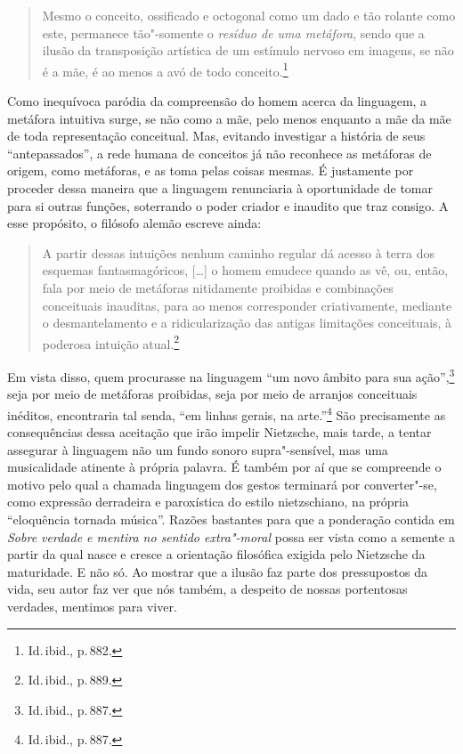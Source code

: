 \begin{quote}
Mesmo o
conceito, ossificado e octogonal como um dado e tão rolante como este,
permanece tão"-somente o \textit{resíduo de uma metáfora}, sendo que a
ilusão da transposição artística de um estímulo nervoso em imagens, se
não é a mãe, é ao menos a avó de todo conceito.\footnote{ Id.\,ibid.,
p.\,882. }
\end{quote}

Como inequívoca paródia da compreensão do homem acerca da linguagem, a
metáfora intuitiva surge, se não como a mãe, pelo menos enquanto a mãe
da mãe de toda representação conceitual. Mas, evitando investigar a
história de seus “antepassados”, a rede humana de conceitos já não
reconhece as metáforas de origem, como metáforas, e as toma pelas
coisas mesmas. É justamente por proceder dessa maneira que a linguagem
renunciaria à oportunidade de tomar para si outras funções, soterrando
o poder criador e inaudito que traz consigo. A esse propósito, o
filósofo alemão escreve ainda: 

\begin{quote}
A partir dessas intuições nenhum
caminho regular dá acesso à terra dos esquemas fantasmagóricos, [\ldots{}]
o homem emudece quando as vê, ou, então, fala por meio 
de metáforas nitidamente proibidas e combinações conceituais inauditas,
para ao menos corresponder criativamente, mediante o desmantelamento e
a ridicularização das antigas limitações conceituais, à poderosa
intuição atual.\footnote{ Id.\,ibid., p.\,889.}
\end{quote}

Em vista disso, quem procurasse na linguagem “um novo âmbito para sua
ação'',\footnote{ Id.\,ibid., p.\,887.} seja por meio de
metáforas proibidas, seja por meio de arranjos conceituais inéditos,
encontraria tal senda, ``em linhas gerais, na
arte.”\footnote{ Id.\,ibid., p.\,887.} São precisamente as consequências
dessa aceitação que irão impelir Nietzsche, mais tarde, a tentar assegurar
à linguagem não um fundo sonoro supra"-sensível, mas uma musicalidade
atinente à própria palavra. É também por aí que se compreende o motivo
pelo qual a chamada linguagem dos gestos terminará por converter"-se,
como expressão derradeira e paroxística do estilo nietzschiano, na
própria “eloquência tornada música”. Razões bastantes para que a
ponderação contida em \textit{Sobre verdade e mentira no sentido
extra"-moral } possa ser vista como a semente a partir da qual nasce e
cresce a orientação filosófica exigida pelo Nietzsche da maturidade. E
não só. Ao mostrar que a ilusão faz parte dos pressupostos da vida, seu
autor faz ver que nós também, a despeito de nossas portentosas
verdades, mentimos para viver.
